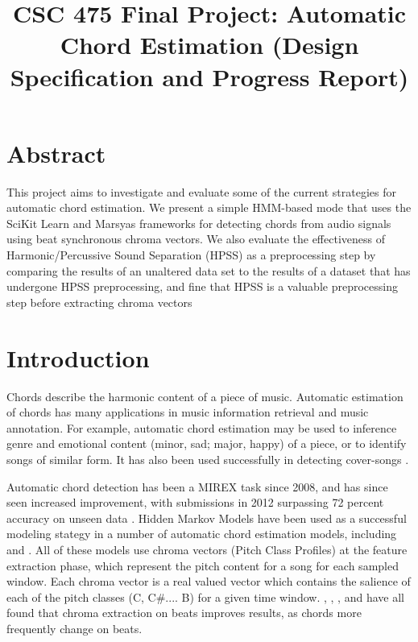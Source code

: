 \documentclass{article}
\title{CSC 475 Final Project: Automatic Chord Estimation (Design Specification and Progress Report)}
\begin{document}
%
\maketitle
%


\section{Abstract}\label{sec:desoutline}
This project aims to investigate and evaluate some of the current strategies
for automatic chord estimation. We present a simple HMM-based mode that uses
the SciKit Learn and Marsyas frameworks for detecting chords from audio signals 
using beat synchronous chroma vectors. We also evaluate the effectiveness of 
Harmonic/Percussive Sound Separation (HPSS) as a preprocessing step by comparing
the results of an unaltered data set to the results of a dataset that has undergone HPSS
preprocessing, and fine that HPSS is a valuable preprocessing step before extracting
chroma vectors

\section{Introduction}\label{sec:intro}

Chords describe the harmonic content of a piece of music. Automatic estimation of chords
has many applications in music information retrieval and music annotation. For example,
automatic chord estimation may be used to inference genre and emotional content 
(minor, sad; major, happy) of a piece, or to identify songs of similar form.
It has also been used successfully in detecting cover-songs \cite{Papadopoulos:18}.

Automatic chord detection has been a MIREX task since 2008, and has since seen increased
improvement, with submissions in 2012 surpassing 72 percent accuracy on unseen data
\cite{McVicar:00}. Hidden Markov Models have been used as a successful modeling stategy
 in a number of automatic chord estimation models, including \cite{Ueda:01} \cite{Lee:15} \cite{Ueda:19}
and \cite{Papadopoulos:18}. All of these models use chroma vectors (Pitch Class Profiles)
at the feature extraction phase, which represent the pitch content for a song for each sampled
window. Each chroma vector is a real valued vector which contains the salience of each of the 
pitch classes (C, C\#.... B) for a given time window. \cite{McVicar:00},  \cite{Lee:15}, \cite{Papadopoulos:18}, and\cite{Zenz:20} have all found that chroma extraction on beats improves results, as chords more frequently change on beats.
\end{document}
